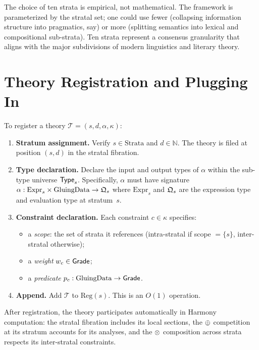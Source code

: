 \begin{remark}
The choice of ten strata is empirical, not mathematical.  The
framework is parameterized by the stratal set; one could use fewer
(collapsing information structure into pragmatics, say) or more
(splitting semantics into lexical and compositional sub-strata).
Ten strata represent a consensus granularity that aligns with the
major subdivisions of modern linguistics and literary theory.
\end{remark}

\section{Theory Registration and Plugging In}
\label{sec:registration}

\begin{construction}
\label{con:registration}
To register a theory $\mathcal{T} = (s, d, \alpha, \kappa)$:
\begin{enumerate}[label=\textbf{Step \arabic*:}]
\item \textbf{Stratum assignment.}  Verify $s \in \mathrm{Strata}$
  and $d \in \mathbb{N}$.  The theory is filed at position $(s, d)$
  in the stratal fibration.
\item \textbf{Type declaration.}  Declare the input and output types
  of $\alpha$ within the sub-type universe $\mathsf{Type}_s$.
  Specifically, $\alpha$ must have signature
  $\alpha : \mathrm{Expr}_s \times \mathrm{GluingData} \to \mathfrak{Q}_s$
  where $\mathrm{Expr}_s$ and $\mathfrak{Q}_s$ are the expression type
  and evaluation type at stratum~$s$.
\item \textbf{Constraint declaration.}  Each constraint
  $c \in \kappa$ specifies:
  \begin{itemize}
  \item a \emph{scope}: the set of strata it references
    (intra-stratal if scope $= \{s\}$, inter-stratal otherwise);
  \item a \emph{weight} $w_c \in \mathsf{Grade}$;
  \item a \emph{predicate} $p_c : \mathrm{GluingData} \to \mathsf{Grade}$.
  \end{itemize}
\item \textbf{Append.}  Add $\mathcal{T}$ to $\mathrm{Reg}(s)$.
  This is an $O(1)$ operation.
\end{enumerate}
\end{construction}

After registration, the theory participates automatically in Harmony
computation: the stratal fibration includes its local sections, the
$\oplus$ competition at its stratum accounts for its analyses, and the
$\otimes$ composition across strata respects its inter-stratal
constraints.

